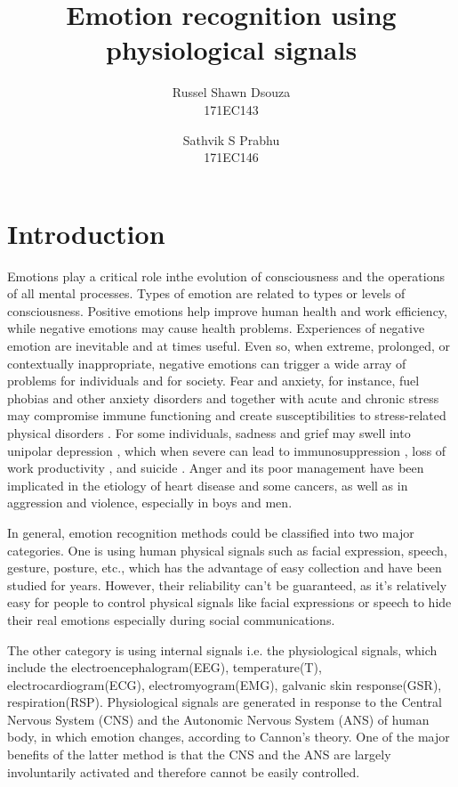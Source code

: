 \documentclass[11pt]{article}
\title{\textbf{Emotion recognition using physiological signals}}
\author{
  Russel Shawn Dsouza\\
  171EC143
  \and
  Sathvik S Prabhu\\
  171EC146
}
\date{}
\theoremstyle{definition}
\begin{document}
  \maketitle

  \section{Introduction}
    Emotions play a critical role inthe evolution of consciousness and the operations of all mental processes. Types of emotion are related to types or levels of consciousness\cite{izard_emotion_2009}.
    Positive emotions help improve human health and work efficiency, while negative emotions may cause health problems.
    Experiences of negative emotion are inevitable and at times useful. Even so, when extreme, prolonged, or contextually inappropriate, negative emotions can trigger a wide array of problems for individuals and for society. 
    Fear and anxiety, for instance, fuel phobias and other anxiety disorders \cite{ohman_automatic_1993} and together with acute and chronic stress may compromise immune functioning and create susceptibilities to stress-related physical disorders \cite{oleary_stress_1990}. 
    For some individuals, sadness and grief may swell into unipolar depression \cite{nolen-hoeksema_response_1993}, which when severe can lead to immunosuppression \cite{oleary_stress_1990}, loss of work productivity \cite{coryell_enduring_1993}, and suicide \cite{chen_lifetime_1996}. 
    Anger and its poor management have been implicated in the etiology of heart disease\cite{barefoot_hostility_1983, fredrickson_hostility_2000, scheier_person_1995} and some cancers\cite{eysenck_cancer_1994, greer_psychological_1975}, as well as in aggression and violence, especially in boys and men\cite{buss_evolution_2016, lemerise_development_2008}.

    In general, emotion recognition methods could be classified into two major categories. 
    One is using human physical signals such as facial expression, speech, gesture, posture, etc., which has the advantage of easy collection and have been studied for years. 
    However, their reliability can’t be guaranteed, as it’s relatively easy for people to control physical signals like facial expressions or speech to hide their real emotions especially during social communications.

    The other category is using internal signals i.e. the physiological signals, which include the electroencephalogram(EEG), temperature(T), electrocardiogram(ECG), electromyogram(EMG), galvanic skin response(GSR), respiration(RSP).
    Physiological signals are generated in response to the Central Nervous System (CNS) and the Autonomic Nervous System (ANS) of human body, in which emotion changes, according to Cannon’s theory\cite{cannon_james-lange_1927}.
    One of the major benefits of the latter method is that the CNS and the ANS are largely involuntarily activated and therefore cannot be easily controlled.
\end{document}
